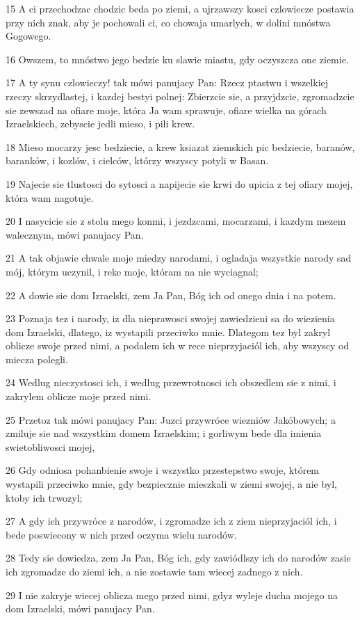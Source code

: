 \par 15 A ci przechodzac chodzic beda po ziemi, a ujrzawszy kosci czlowiecze postawia przy nich znak, aby je pochowali ci, co chowaja umarlych, w dolini mnóstwa Gogowego.
\par 16 Owszem, to mnóstwo jego bedzie ku slawie miastu, gdy oczyszcza one ziemie.
\par 17 A ty synu czlowieczy! tak mówi panujacy Pan: Rzecz ptastwu i wszelkiej rzeczy skrzydlastej, i kazdej bestyi polnej: Zbierzcie sie, a przyjdzcie, zgromadzcie sie zewszad na ofiare moje, która Ja wam sprawuje, ofiare wielka na górach Izraelskiech, zebyscie jedli mieso, i pili krew.
\par 18 Mieso mocarzy jesc bedziecie, a krew ksiazat ziemskich pic bedziecie, baranów, baranków, i kozlów, i cielców, którzy wszyscy potyli w Basan.
\par 19 Najecie sie tlustosci do sytosci a napijecie sie krwi do upicia z tej ofiary mojej, która wam nagotuje.
\par 20 I nasycicie sie z stolu mego konmi, i jezdzcami, mocarzami, i kazdym mezem walecznym, mówi panujacy Pan.
\par 21 A tak objawie chwale moje miedzy narodami, i ogladaja wszystkie narody sad mój, którym uczynil, i reke moje, któram na nie wyciagnal;
\par 22 A dowie sie dom Izraelski, zem Ja Pan, Bóg ich od onego dnia i na potem.
\par 23 Poznaja tez i narody, iz dla nieprawosci swojej zawiedzieni sa do wiezienia dom Izraelski, dlatego, iz wystapili przeciwko mnie. Dlategom tez byl zakryl oblicze swoje przed nimi, a podalem ich w rece nieprzyjaciól ich, aby wszyscy od miecza polegli.
\par 24 Wedlug nieczystosci ich, i wedlug przewrotnosci ich obszedlem sie z nimi, i zakrylem oblicze moje przed nimi.
\par 25 Przetoz tak mówi panujacy Pan: Juzci przywróce wiezniów Jakóbowych; a zmiluje sie nad wszystkim domem Izraelskim; i gorliwym bede dla imienia swietobliwosci mojej,
\par 26 Gdy odniosa pohanbienie swoje i wszystko przestepstwo swoje, którem wystapili przeciwko mnie, gdy bezpiecznie mieszkali w ziemi swojej, a nie byl, ktoby ich trwozyl;
\par 27 A gdy ich przywróce z narodów, i zgromadze ich z ziem nieprzyjaciól ich, i bede poswiecony w nich przed oczyma wielu narodów.
\par 28 Tedy sie dowiedza, zem Ja Pan, Bóg ich, gdy zawiódlszy ich do narodów zasie ich zgromadze do ziemi ich, a nie zostawie tam wiecej zadnego z nich.
\par 29 I nie zakryje wiecej oblicza mego przed nimi, gdyz wyleje ducha mojego na dom Izraelski, mówi panujacy Pan.

